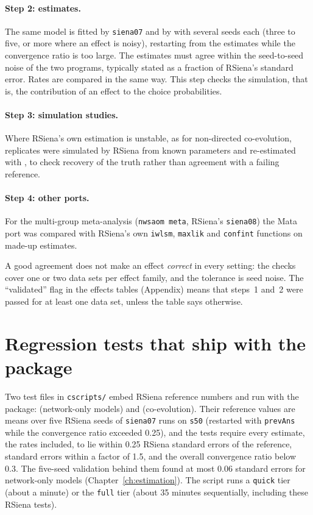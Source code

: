 \paragraph{Step 2: estimates.} The same model is fitted by \texttt{siena07} and by \nwsaom{} with several seeds each (three to five, or more where an effect is noisy), restarting from the estimates while the convergence ratio is too large. The estimates must agree within the seed-to-seed noise of the two programs, typically stated as a fraction of RSiena's standard error. Rates are compared in the same way. This step checks the simulation, that is, the contribution of an effect to the choice probabilities.

\paragraph{Step 3: simulation studies.} Where RSiena's own estimation is unstable, as for non-directed co-evolution, replicates were simulated by RSiena from known parameters and re-estimated with \nwsaom{}, to check recovery of the truth rather than agreement with a failing reference.

\paragraph{Step 4: other ports.} For the multi-group meta-analysis (\texttt{nwsaom meta}, RSiena's \texttt{siena08}) the Mata port was compared with RSiena's own \texttt{iwlsm}, \texttt{maxlik} and \texttt{confint} functions on made-up estimates.

A good agreement does not make an effect \emph{correct} in every setting: the checks cover one or two data sets per effect family, and the tolerance is seed noise. The ``validated'' flag in the effects tables (Appendix) means that steps~1 and~2 were passed for at least one data set, unless the table says otherwise.

\section{Regression tests that ship with the package}
Two test files in \texttt{cscripts/} embed RSiena reference numbers and run with the package:  (network-only models) and  (co-evolution). Their reference values are means over five RSiena seeds of \texttt{siena07} runs on \texttt{s50} (restarted with \texttt{prevAns} while the convergence ratio exceeded 0.25), and the tests require every estimate, the rates included, to lie within 0.25 RSiena standard errors of the reference, standard errors within a factor of 1.5, and the overall convergence ratio below 0.3. The five-seed validation behind them found at most 0.06 standard errors for network-only models (Chapter~\ref{ch:estimation}). The script  runs a \texttt{quick} tier (about a minute) or the \texttt{full} tier (about 35 minutes sequentially, including these RSiena tests).

